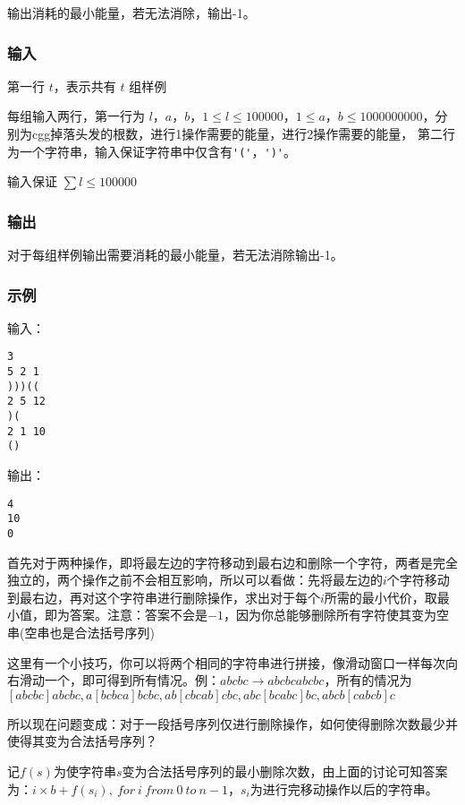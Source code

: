 输出消耗的最小能量，若无法消除，输出-1。

\subsubsection{输入}
第一行 $t$，表示共有 $t$ 组样例

每组输入两行，第一行为 $l$，$a$，$b$，$1 \leq l \leq 100000$，$1 \leq a$，$b \leq
1000000000$，分别为cgg掉落头发的根数，进行1操作需要的能量，进行2操作需要的能量，
第二行为一个字符串，输入保证字符串中仅含有\verb|'('|，\verb|')'|。

输入保证 $\sum l \leq 100000$

\subsubsection{输出}
对于每组样例输出需要消耗的最小能量，若无法消除输出-1。

\subsubsection{示例}
输入：
\begin{lstlisting}
3
5 2 1
)))((
2 5 12
)(
2 1 10
()
\end{lstlisting}

输出：
\begin{lstlisting}
4
10
0
\end{lstlisting}

首先对于两种操作，即将最左边的字符移动到最右边和删除一个字符，两者是完全独立的，两个操作之前不会相互影响，所以可以看做：先将最左边的$i$个字符移动到最右边，再对这个字符串进行删除操作，求出对于每个$i$所需的最小代价，取最小值，即为答案。注意：答案不会是$-1$，因为你总能够删除所有字符使其变为空串(空串也是合法括号序列)

这里有一个小技巧，你可以将两个相同的字符串进行拼接，像滑动窗口一样每次向右滑动一个，即可得到所有情况。例：$abcbc \rightarrow abcbcabcbc$，所有的情况为$[abcbc]abcbc,a[bcbca]bcbc,ab[cbcab]cbc,abc[bcabc]bc,abcb[cabcb]c$

所以现在问题变成：对于一段括号序列仅进行删除操作，如何使得删除次数最少并使得其变为合法括号序列？

记$f(s)$为使字符串$s$变为合法括号序列的最小删除次数，由上面的讨论可知答案为：$i\times b + f(s_i), \ for\ i\ from\ 0\ to\ n-1$，$s_i$为进行完移动操作以后的字符串。

